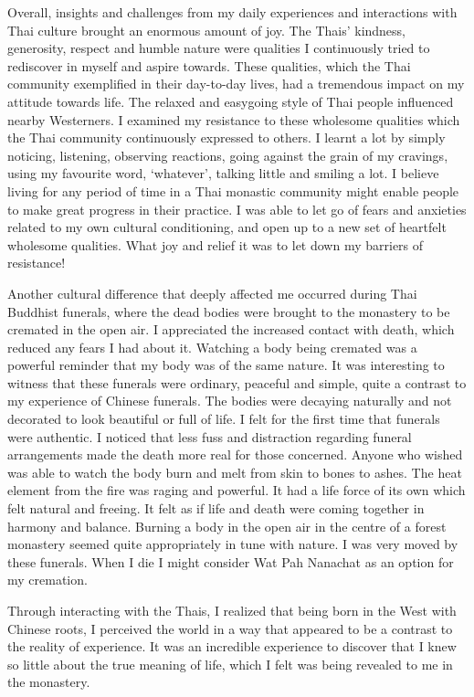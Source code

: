 Overall, insights and challenges from my daily experiences and
interactions with Thai culture brought an enormous amount of joy. The
Thais' kindness, generosity, respect and humble nature were qualities I
continuously tried to rediscover in myself and aspire towards. These
qualities, which the Thai community exemplified in their day-to-day
lives, had a tremendous impact on my attitude towards life. The relaxed
and easygoing style of Thai people influenced nearby Westerners. I
examined my resistance to these wholesome qualities which the Thai
community continuously expressed to others. I learnt a lot by simply
noticing, listening, observing reactions, going against the grain of my
cravings, using my favourite word, `whatever', talking little and
smiling a lot. I believe living for any period of time in a Thai
monastic community might enable people to make great progress in their
practice. I was able to let go of fears and anxieties related to my own
cultural conditioning, and open up to a new set of heartfelt wholesome
qualities. What joy and relief it was to let down my barriers of
resistance!

Another cultural difference that deeply affected me occurred during Thai
Buddhist funerals, where the dead bodies were brought to the monastery
to be cremated in the open air. I appreciated the increased contact with
death, which reduced any fears I had about it. Watching a body being
cremated was a powerful reminder that my body was of the same nature. It
was interesting to witness that these funerals were ordinary, peaceful
and simple, quite a contrast to my experience of Chinese funerals. The
bodies were decaying naturally and not decorated to look beautiful or
full of life. I felt for the first time that funerals were authentic. I
noticed that less fuss and distraction regarding funeral arrangements
made the death more real for those concerned. Anyone who wished was able
to watch the body burn and melt from skin to bones to ashes. The heat
element from the fire was raging and powerful. It had a life force of
its own which felt natural and freeing. It felt as if life and death
were coming together in harmony and balance. Burning a body in the open
air in the centre of a forest monastery seemed quite appropriately in
tune with nature. I was very moved by these funerals. When I die I might
consider Wat Pah Nanachat as an option for my cremation.

Through interacting with the Thais, I realized that being born in the
West with Chinese roots, I perceived the world in a way that appeared to
be a contrast to the reality of experience. It was an incredible
experience to discover that I knew so little about the true meaning of
life, which I felt was being revealed to me in the monastery.

